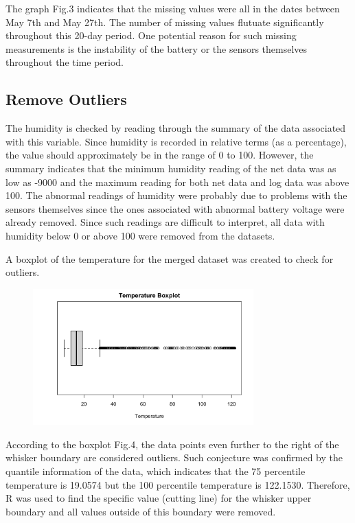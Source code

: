 \documentclass[twocolumn,11pt]{asme2ej}
\begin{document}
The graph Fig.3 indicates that the missing values were all in the dates between May 7th and May 27th. The number of missing values flutuate significantly throughout this 20-day period. One potential reason for such missing measurements is the instability of the battery or the sensors themselves throughout the time period.
\subsection{Remove Outliers}

The humidity is checked by reading through the summary of the data associated with this variable. Since humidity is recorded in relative terms (as a percentage), the value should approximately be in the range of 0 to 100. However, the summary indicates that the minimum humidity reading of the net data was as low as -9000 and the maximum reading for both net data and log data was above 100. The abnormal readings of humidity were probably due to problems with the sensors themselves since the ones associated with abnormal battery voltage were already removed. Since such readings are difficult to interpret, all data with humidity below 0 or above 100 were removed from the datasets.

A boxplot of the temperature for the merged dataset was created to check for outliers. 

\begin{figure}
    \centering
    \includegraphics[width=85mm]{2d.png} 
    \caption{}
    \label{fig:2d}
\end{figure}


According to the boxplot Fig.4, the data points even further to the right of the whisker boundary are considered outliers. Such conjecture was confirmed by the quantile information of the data, which indicates that the 75 percentile temperature is 19.0574 but the 100 percentile temperature is 122.1530. Therefore, R was used to find the specific value (cutting line) for the whisker upper boundary and all values outside of this boundary were removed.
\end{document}

